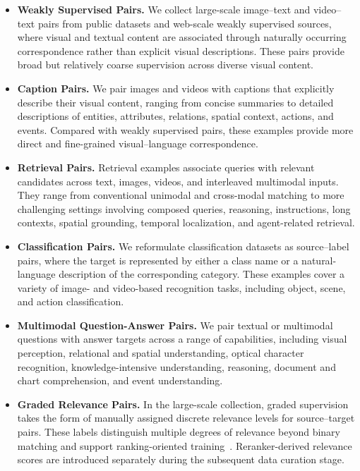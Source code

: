 \documentclass[]{wechat}
\begin{document}
\begin{itemize}
    \item \textbf{Weakly Supervised Pairs.} We collect large-scale image--text and video--text pairs from public datasets and web-scale weakly supervised sources, where visual and textual content are associated through naturally occurring correspondence rather than explicit visual descriptions. These pairs provide broad but relatively coarse supervision across diverse visual content. %

    \item \textbf{Caption Pairs.} We pair images and videos with captions that explicitly describe their visual content, ranging from concise summaries to detailed descriptions of entities, attributes, relations, spatial context, actions, and events. Compared with weakly supervised pairs, these examples provide more direct and fine-grained visual--language correspondence.

    \item \textbf{Retrieval Pairs.} Retrieval examples associate queries with relevant candidates across text, images, videos, and interleaved multimodal inputs. They range from conventional unimodal and cross-modal matching to more challenging settings involving composed queries, reasoning, instructions, long contexts, spatial grounding, temporal localization, and agent-related retrieval.

    \item \textbf{Classification Pairs.} We reformulate classification datasets as source--label pairs, where the target is represented by either a class name or a natural-language description of the corresponding category. These examples cover a variety of image- and video-based recognition tasks, including object, scene, and action classification.

    \item \textbf{Multimodal Question-Answer Pairs.} We pair textual or multimodal questions with answer targets across a range of capabilities, including visual perception, relational and spatial understanding, optical character recognition, knowledge-intensive understanding, reasoning, document and chart comprehension, and event understanding.

    \item \textbf{Graded Relevance Pairs.} In the large-scale collection, graded supervision takes the form of manually assigned discrete relevance levels for source--target pairs. These labels distinguish multiple degrees of relevance beyond binary matching and support ranking-oriented training~\citep{graded-level}. Reranker-derived relevance scores are introduced separately during the subsequent data curation stage.
\end{itemize}
\end{document}
